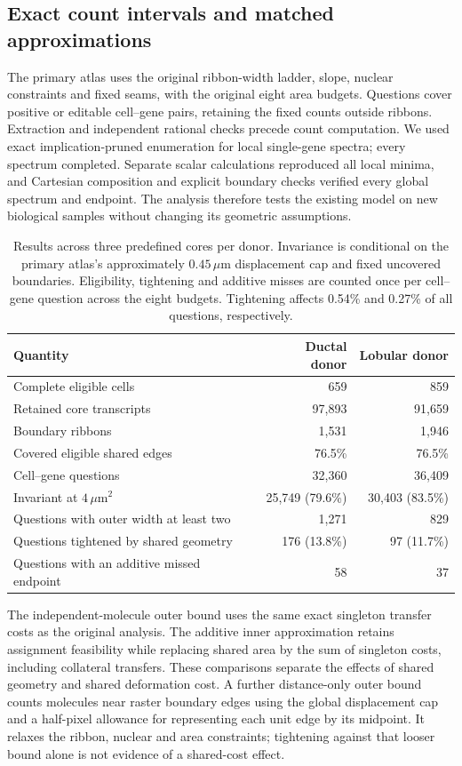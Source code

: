 \FloatBarrier
\subsection{Exact count intervals and matched approximations}
The primary atlas uses the original ribbon-width ladder, slope, nuclear constraints and fixed seams, with the original eight area budgets. Questions cover positive or editable cell--gene pairs, retaining the fixed counts outside ribbons. Extraction and independent rational checks precede count computation. We used exact implication-pruned enumeration for local single-gene spectra; every spectrum completed. Separate scalar calculations reproduced all local minima, and Cartesian composition and explicit boundary checks verified every global spectrum and endpoint. The analysis therefore tests the existing model on new biological samples without changing its geometric assumptions.

\begin{table}[ht]\centering
\begin{tabular}{lrr}\toprule
Quantity&Ductal donor&Lobular donor\\\midrule
Complete eligible cells&659&859\\
Retained core transcripts&97,893&91,659\\
Boundary ribbons&1,531&1,946\\
Covered eligible shared edges&76.5\%&76.5\%\\
Cell--gene questions&32,360&36,409\\
Invariant at $4\,\mu\mathrm m^2$&25,749 (79.6\%)&30,403 (83.5\%)\\
Questions with outer width at least two&1,271&829\\
Questions tightened by shared geometry&176 (13.8\%)&97 (11.7\%)\\
Questions with an additive missed endpoint&58&37\\\bottomrule
\end{tabular}
\caption{Results across three predefined cores per donor. Invariance is conditional on the primary atlas's approximately $0.45\,\mu\mathrm m$ displacement cap and fixed uncovered boundaries. Eligibility, tightening and additive misses are counted once per cell--gene question across the eight budgets. Tightening affects 0.54\% and 0.27\% of all questions, respectively.}\label{tab:biological-replication}
\end{table}

The independent-molecule outer bound uses the same exact singleton transfer costs as the original analysis. The additive inner approximation retains assignment feasibility while replacing shared area by the sum of singleton costs, including collateral transfers. These comparisons separate the effects of shared geometry and shared deformation cost. A further distance-only outer bound counts molecules near raster boundary edges using the global displacement cap and a half-pixel allowance for representing each unit edge by its midpoint. It relaxes the ribbon, nuclear and area constraints; tightening against that looser bound alone is not evidence of a shared-cost effect.

